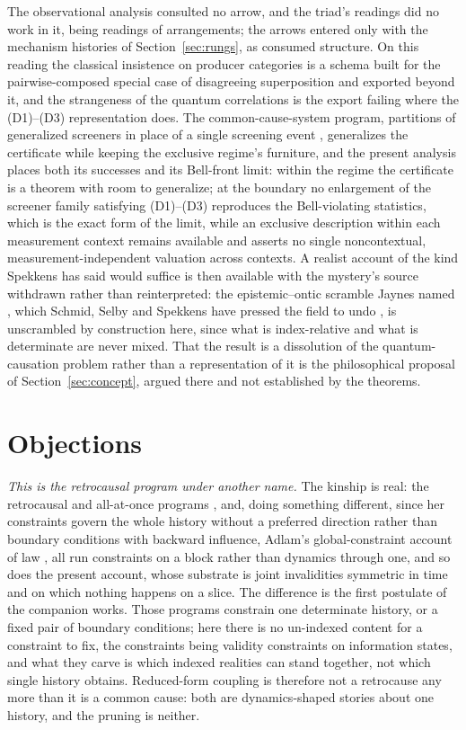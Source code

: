 \documentclass[11pt]{article}
\begin{document}
The observational analysis consulted no arrow, and the triad's readings did no work in it, being readings of arrangements; the arrows entered only with the mechanism histories of Section~\ref{sec:rungs}, as consumed structure. On this reading the classical insistence on producer categories is a schema built for the pairwise-composed special case of disagreeing superposition and exported beyond it, and the strangeness of the quantum correlations is the export failing where the (D1)--(D3) representation does. The common-cause-system program, partitions of generalized screeners in place of a single screening event \cite{hoferszabo2013principle}, generalizes the certificate while keeping the exclusive regime's furniture, and the present analysis places both its successes and its Bell-front limit: within the regime the certificate is a theorem with room to generalize; at the boundary no enlargement of the screener family satisfying (D1)--(D3) reproduces the Bell-violating statistics, which is the exact form of the limit, while an exclusive description within each measurement context remains available and asserts no single noncontextual, measurement-independent valuation across contexts. A realist account of the kind Spekkens has said would suffice \cite{spekkens2024escapedsapiens} is then available with the mystery's source withdrawn rather than reinterpreted: the epistemic--ontic scramble Jaynes named \cite{jaynes1990probability}, which Schmid, Selby and Spekkens have pressed the field to undo \cite{schmid2020unscrambling}, is unscrambled by construction here, since what is index-relative and what is determinate are never mixed. That the result is a dissolution of the quantum-causation problem rather than a representation of it is the philosophical proposal of Section~\ref{sec:concept}, argued there and not established by the theorems.

\section{Objections}
\label{sec:objections}

\emph{This is the retrocausal program under another name.} The kinship is real: the retrocausal and all-at-once programs \cite{wharton2015universe, price2012does, sutherland2008causally}, and, doing something different, since her constraints govern the whole history without a preferred direction rather than boundary conditions with backward influence, Adlam's global-constraint account of law \cite{adlam2022laws}, all run constraints on a block rather than dynamics through one, and so does the present account, whose substrate is joint invalidities symmetric in time and on which nothing happens on a slice. The difference is the first postulate of the companion works. Those programs constrain one determinate history, or a fixed pair of boundary conditions; here there is no un-indexed content for a constraint to fix, the constraints being validity constraints on information states, and what they carve is which indexed realities can stand together, not which single history obtains. Reduced-form coupling is therefore not a retrocause any more than it is a common cause: both are dynamics-shaped stories about one history, and the pruning is neither.
\end{document}
